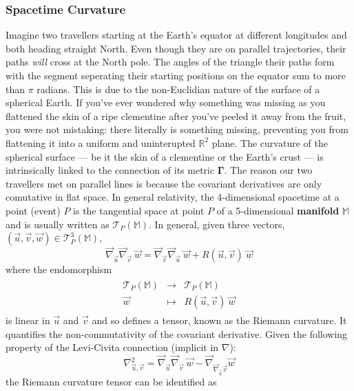 \subsubsection{Spacetime Curvature}

Imagine two travellers starting at the Earth's equator at different longitudes and both heading straight North. Even though they are on parallel trajectories, their paths \emph{will} cross at the North pole. The angles of the triangle their paths form with the segment seperating their starting positions on the equator sum to more than $\pi$ radians. This is due to the non-Euclidian nature of the surface of a spherical Earth. If you've ever wondered why something was missing as you flattened the skin of a ripe clementine after you've peeled it away from the fruit, you were not mistaking: there literally is something missing, preventing you from flattening it into a uniform and uninterupted $\mathbb{R}^2$ plane. The curvature of the spherical surface --- be it the skin of a clementine or the Earth's crust --- is intrinsically linked to the connection of its metric $\pmb{\Gamma}$. The reason our two travellers met on parallel lines is because the covariant derivatives are only comutative in flat space. In general relativity, the 4-dimensional spacetime at a point (event) $P$ is the tangential space at point $P$ of a 5-dimensional \textbf{manifold} $\mathbb{M}$ and is usually written as $\mathcal{T}_P(\mathbb{M})$. In general, given three vectors, $(\vec{u}, \vec{v}, \vec{w}) \in \mathcal{T}^3_P (\mathbb{M})$,
\begin{equation}
\label{def:riemann_curvature_def}
\vec{\nabla}_{\vec{u}} \vec{\nabla}_{\vec{v}}~ \vec{w} = \vec{\nabla}_{\vec{v}} \vec{\nabla}_{\vec{u}} ~\vec{w} + R(\vec{u}, \vec{v})~\vec{w}
\end{equation} where the endomorphism
\begin{eqnarray}
\begin{array}{ccc}
\mathcal{T}_P(\mathbb{M}) & \longrightarrow & \mathcal{T}_P(\mathbb{M})\\
\vec{w} & \longmapsto & R(\vec{u}, \vec{v})~\vec{w}
\end{array}
\end{eqnarray} is linear in $\vec{u}$ and $\vec{v}$ and so defines a tensor, known as the Riemann curvature. It quantifies the non-commutativity of the covariant derivative. Given the following property of the Levi-Civita connection (implicit in $\nabla$): 
\begin{equation}
\label{eq:doublecov}
\nabla^2_{\vec{u}, \vec{v}} = \vec{\nabla}_{\vec{u}} \vec{\nabla}_{\vec{v}}~ \vec{w} - \vec{\nabla}_{\vec{\nabla}_{\vec{u}}\vec{v}} \vec{w}
\end{equation} the Riemann curvature tensor can be identified as
